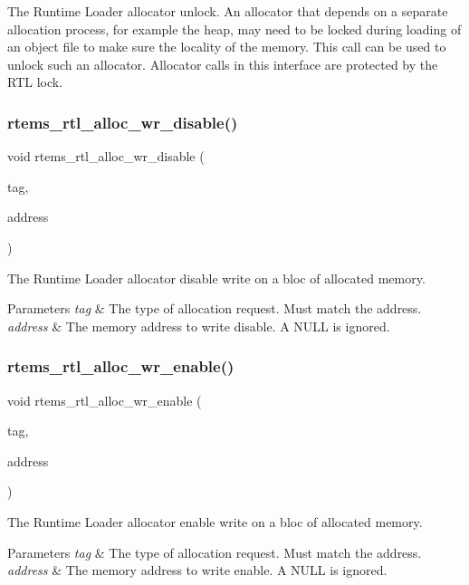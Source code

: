 The Runtime Loader allocator unlock. An allocator that depends on a separate allocation process, for example the heap, may need to be locked during loading of an object file to make sure the locality of the memory. This call can be used to unlock such an allocator. Allocator calls in this interface are protected by the R\+TL lock. \mbox{\label{rtl-allocator_8h_a97d8fccb913b102e6d102cc86431ad64}} 
\subsubsection{\texorpdfstring{rtems\_rtl\_alloc\_wr\_disable()}{rtems\_rtl\_alloc\_wr\_disable()}}
{\footnotesize\ttfamily void rtems\+\_\+rtl\+\_\+alloc\+\_\+wr\+\_\+disable (\begin{DoxyParamCaption}\item[{\mbox{\hyperlink{rtl-allocator_8h_a445a8615118b7fc14005ab20583153fd}{rtems\+\_\+rtl\+\_\+alloc\+\_\+tag}}}]{tag,  }\item[{void $\ast$}]{address }\end{DoxyParamCaption})}

The Runtime Loader allocator disable write on a bloc of allocated memory.


\begin{DoxyParams}{Parameters}
{\em tag} & The type of allocation request. Must match the address. \\
\hline
{\em address} & The memory address to write disable. A N\+U\+LL is ignored. \\
\hline
\end{DoxyParams}
\mbox{\label{rtl-allocator_8h_a4453db077482ecf6647ce38e2381c45c}} 
\subsubsection{\texorpdfstring{rtems\_rtl\_alloc\_wr\_enable()}{rtems\_rtl\_alloc\_wr\_enable()}}
{\footnotesize\ttfamily void rtems\+\_\+rtl\+\_\+alloc\+\_\+wr\+\_\+enable (\begin{DoxyParamCaption}\item[{\mbox{\hyperlink{rtl-allocator_8h_a445a8615118b7fc14005ab20583153fd}{rtems\+\_\+rtl\+\_\+alloc\+\_\+tag}}}]{tag,  }\item[{void $\ast$}]{address }\end{DoxyParamCaption})}

The Runtime Loader allocator enable write on a bloc of allocated memory.


\begin{DoxyParams}{Parameters}
{\em tag} & The type of allocation request. Must match the address. \\
\hline
{\em address} & The memory address to write enable. A N\+U\+LL is ignored. \\
\hline
\end{DoxyParams}
